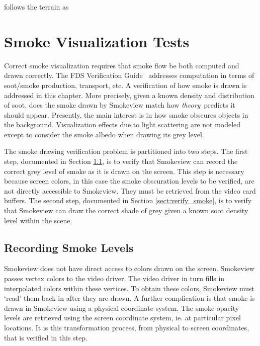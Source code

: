 \documentclass[11pt,twoside]{book}
\begin{document}

follows the terrain as


\chapter{Smoke Visualization Tests}

Correct smoke visualization requires that smoke flow be both computed and drawn correctly.
The FDS Verification Guide~\cite{FDS_Verification_Guide} addresses computation in terms of
soot/smoke production, transport, etc. A verification of how smoke is drawn is addressed in
this chapter. More precisely, given a known density and distribution of soot, does the smoke
drawn by Smokeview match how {\em theory}\ predicts it should appear.  Presently, the main
interest is in how smoke obscures objects in the background.  Visualization effects due to
light scattering are not modeled except to consider the smoke albedo when drawing its grey level.

The smoke drawing verification problem is partitioned into two steps. The first step,
documented in Section \ref{sect:record_smoke}, is to verify that Smokeview can record
the correct grey level of smoke as it is drawn on the screen. This step is necessary
because screen colors, in this case the smoke obscuration levels to be verified, are
not directly accessible to Smokeview. They must be retrieved from the video card
buffers. The second step, documented in Section \ref{sect:verify_smoke}, is to
verify that Smokeview can draw the correct shade of grey given a known soot density level
within the scene.
\section{Recording Smoke Levels}
\label{sect:record_smoke}

Smokeview does not have direct access to colors drawn on the screen.
Smokeview passes vertex colors to the video driver.
The video driver in turn fills in interpolated colors within these vertices.
To obtain these colors, Smokeview must `read' them back in after they are drawn.
A further complication is that smoke is drawn in Smokeview using a physical coordinate system.
The smoke opacity levels are retrieved using the screen coordinate system, ie.
at particular pixel locations.
It is this transformation process, from physical to screen coordinates,
that is verified in this step.
\end{document}
